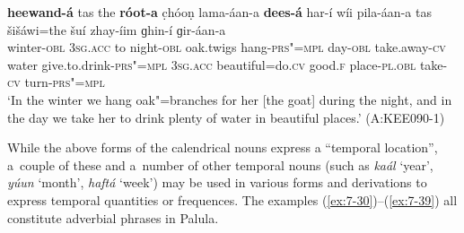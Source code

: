 \largerpage[-1]
 
\ea
\label{ex:7-29}
\gll \textbf{heewand-á} tas the \textbf{róot-a} c̣hóoṇ  lama-áan-a \textbf{dees-á} har-í wíi
pila-áan-a tas šišáwi=the šuí zhay-íim ɡhin-í ɡir-áan-a\\
winter-\textsc{obl } \textsc{3sg.acc} to night-\textsc{obl} oak.twigs  hang-\textsc{prs"=mpl} day-\textsc{obl} take.away-\textsc{cv} water give.to.drink-\textsc{prs"=mpl} \textsc{3sg.acc}  beautiful=do.\textsc{cv} good.\textsc{f} place-\textsc{pl.obl} take-\textsc{cv} turn-\textsc{prs"=mpl} \\
\glt `In the winter we hang oak"=branches for her [the goat] during the night, and in the day we take her to drink plenty of water in beautiful places.' (A:KEE090-1)
\z

While the above  forms of the calendrical nouns express a ``temporal location'', a~couple of these and a~number of other temporal nouns (such as \textit{kaál} `year', \textit{yúun} `month', \textit{haftá} `week') may be used in various forms and derivations to express temporal quantities or frequences. The examples (\ref{ex:7-30})--(\ref{ex:7-39}) all constitute adverbial phrases in Palula.

